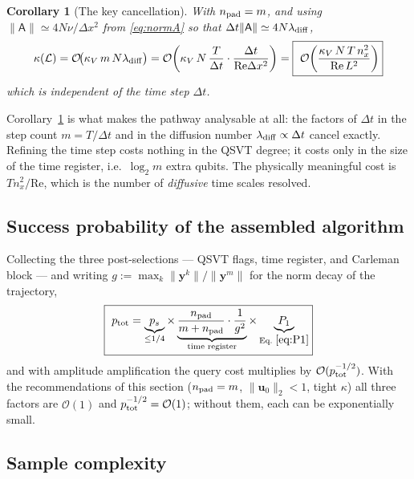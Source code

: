 \documentclass[11pt,a4paper]{article}
\theoremstyle{plain}
\newtheorem{corollary}[proposition]{Corollary}
\theoremstyle{definition}
\theoremstyle{remark}
\newcommand{\Rey}{\mathrm{Re}}
\newcommand{\Oh}{\mathcal{O}}
\newcommand{\norm}[1]{\lVert #1 \rVert}
\newcommand{\uvec}{\bm{u}}
\newcommand{\yvec}{\bm{y}}
\newcommand{\Amat}{\mathsf{A}}
\begin{document}
\begin{corollary}[The key cancellation]
\label{cor:cancel}
With $n_{\rm pad}=m$, and using $\norm{\Amat}\simeq4N\nu/\Delta x^2$ from
\eqref{eq:normA} so that $\Delta t\norm{\Amat}\simeq4N\lambda_{\rm diff}$,
\begin{equation}
\kappa(\mathcal{L})=\Oh\!\bigl(\kappa_V\,m\,N\lambda_{\rm diff}\bigr)
=\Oh\!\left(\kappa_V\,N\,\frac{T}{\Delta t}\cdot\frac{\Delta t}{\Rey\Delta x^{2}}\right)
=\boxed{\ \Oh\!\left(\frac{\kappa_V\,N\,T\,n_x^{2}}{\Rey\,L^{2}}\right)}
\label{eq:dilkappa2}
\end{equation}
which is \emph{independent of the time step $\Delta t$}.
\end{corollary}

Corollary~\ref{cor:cancel} is what makes the pathway analysable at all: the
factors of $\Delta t$ in the step count $m=T/\Delta t$ and in the diffusion
number $\lambda_{\rm diff}\propto\Delta t$ cancel exactly.  Refining the time
step costs nothing in the QSVT degree; it costs only in the size of the time
register, i.e.\ $\log_2 m$ extra qubits.  The physically meaningful cost is
$Tn_x^2/\Rey$, which is the number of \emph{diffusive} time scales resolved.

\subsection{Success probability of the assembled algorithm}

Collecting the three post-selections --- QSVT flags, time register, and Carleman
block --- and writing $g:=\max_k\norm{\yvec^k}/\norm{\yvec^m}$ for the norm
decay of the trajectory,
\begin{equation}
\boxed{\
p_{\rm tot}
=\underbrace{p_s}_{\le1/4}\times
\underbrace{\frac{n_{\rm pad}}{m+n_{\rm pad}}\cdot\frac{1}{g^{2}}}_{\text{time register}}\times
\underbrace{P_1}_{\text{Eq.~}\eqref{eq:P1}} }
\label{eq:ptot}
\end{equation}
and with amplitude amplification the query cost multiplies by
$\Oh(p_{\rm tot}^{-1/2})$.  With the recommendations of this section
($n_{\rm pad}=m$, $\norm{\uvec_0}_2<1$, tight $\kappa$) all three factors are $\Oh(1)$ and
$p_{\rm tot}^{-1/2}=\Oh(1)$; without them, each can be exponentially small.

\subsection{Sample complexity}
\label{sec:samples}
\end{document}
